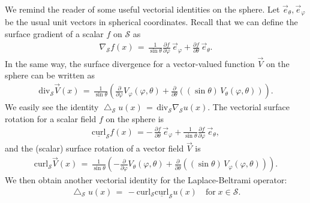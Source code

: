 \documentclass[final]{siamltex}
\newcommand{\lap}{\bigtriangleup}
\renewcommand{\S} {\mathcal{S}}
\begin{document}
We remind the reader of some useful vectorial
identities on the sphere. Let $ \vec{e}_\theta,
\vec{e}_{\varphi} $ be the usual unit vectors in spherical coordinates.
Recall that we can define the surface gradient of a scalar $f$ on $\S$
as
\begin{align*}
\nabla_{\S} f(x) \,  = \, \frac{1}{\sin \theta}\frac{\partial f}{\partial \varphi}
\,\vec{e}_{\varphi} + \frac{\partial f}{\partial \theta}\, \vec{e}_{\theta}.
\end{align*}
In the same way, the surface divergence for a vector-valued
function $\vec{V}$ on the sphere can be written as
\begin{align*}
\mbox{div}_{\S} \vec{V}(x) \, = \, 
\frac{1}{\sin \theta} \left(
\frac{\partial}{\partial \varphi}
V_{\varphi}(\varphi,\theta) +
\frac{\partial}{\partial \theta} ((\sin\theta) \, V_{\theta}(\varphi,\theta) )
\right).
\end{align*}
We easily see the identity $\lap_{\S}u(x) \, = \,
\mbox{div}_{\S}\nabla_{\S} u(x)$.  The vectorial surface rotation for a
scalar field $f$ on the sphere is 
\begin{align*}
\underline{\mbox{curl}}_{\S} f(x) \, = -\, \frac{\partial
f}{\partial \theta} \,\vec{e}_{\varphi} + \frac{1}{\sin
\theta}\frac{\partial f}{\partial \varphi}\, \vec{e}_{\theta},
\end{align*}
and the (scalar) surface rotation of a vector field $\vec{V}$ is
\begin{align*}
\mbox{curl}_{\S} \vec{V}(x) \, = \,
\frac{1}{\sin \theta} \left(
- \frac{\partial}{\partial \varphi} V_{\theta}(\varphi,\theta) +
\frac{\partial}{\partial \theta} ((\sin \theta) \, V_{\varphi}(\varphi,\theta))  
\right).
\end{align*}
We then obtain another vectorial identity for the Laplace-Beltrami
operator:
\begin{align*}
\lap_{\S} u(x) \, = \, 
- \mbox{curl}_{\S} \underline{\mbox{curl}}_{\S} u(x) 
\quad \mbox{for} \; x \in {\S}.
\end{align*}
\end{document}
